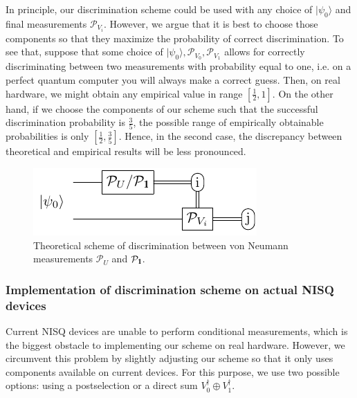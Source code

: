 \documentclass[preprint,12pt, a4paper, dvipsnames]{elsarticle}
\newcommand{\ket}[1]{\ensuremath{|#1\rangle}}
\newcommand{\1}{{\rm 1\hspace{-0.9mm}l}}
\newcommand{\Id}{{\rm 1\hspace{-0.9mm}l}}
\newcommand{\PP}{\mathcal{P}}
\theoremstyle{definition}
\begin{document}
In principle, our discrimination scheme could be used with any choice of
$\ket{\psi_0}$ and final measurements $\PP_{V_i}$. However, we argue that it is best to choose those
components so that they maximize the probability of correct discrimination. To see that,
suppose that some choice of $\ket{\psi_0}, \PP_{V_0}, \PP_{V_1}$ allows for correctly discriminating
between two measurements with probability equal to one, i.e. on a perfect quantum computer you will always
make a correct guess. Then, on real hardware, we might obtain any empirical value in range $\left[\frac{1}{2},
1\right]$. On the other hand, if we choose the components of our scheme such that the successful
discrimination probability is $\frac{3}{5}$, the possible range of empirically obtainable probabilities
is only $\left[\frac{1}{2}, \frac{3}{5}\right]$. Hence, in the second case, the discrepancy between theoretical and empirical
results will be less pronounced.


\begin{figure}[h!]
	\centering
	\includegraphics[scale=1.7]{pics/theoretical_scheme}
	\caption{Theoretical  scheme of discrimination  between von Neumann measurements $\PP_{U}$ and $\PP_\Id$. }
	\label{fig:theoretical_scheme}
\end{figure}

\subsubsection{Implementation of discrimination scheme on actual NISQ devices}

Current NISQ devices are unable to perform conditional measurements, which is the biggest obstacle
to implementing our scheme on real hardware. However, we circumvent this problem by slightly
adjusting our scheme so that it only uses components available on current devices. For this purpose,
we use two possible options: using a postselection or a direct sum $V_0^\dagger\oplus V_1^\dagger$.
\end{document}
